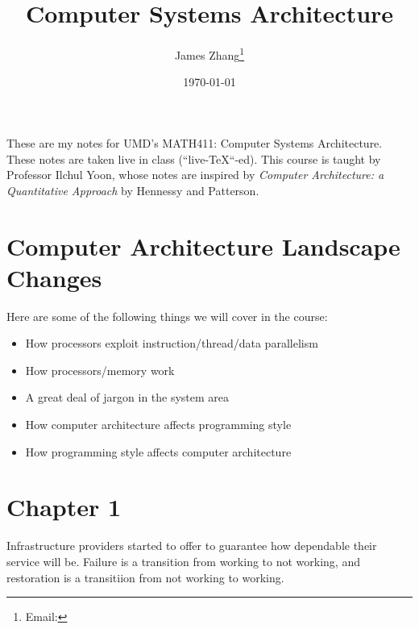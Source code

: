 \documentclass[12pt]{scrartcl}
\begin{document}
\title{Computer Systems Architecture}
\author{James Zhang\thanks{Email: }}
\date{\today}




\maketitle
These are my notes for UMD's MATH411: Computer Systems Architecture. These notes are taken live in class 
(``live-\TeX``-ed). This course is taught by Professor Ilchul Yoon, whose notes are inspired by \textit{Computer Architecture:
 a Quantitative Approach} by Hennessy and Patterson.
\tableofcontents

\newpage

\section*{Computer Architecture Landscape Changes}

Here are some of the following things we will cover in the course:
\begin{itemize}
  \item How processors exploit instruction/thread/data parallelism
  \item How processors/memory work
  \item A great deal of jargon in the system area
  \item How computer architecture affects programming style
  \item How programming style affects computer architecture
\end{itemize}

\section{Chapter 1}

\begin{definition}[Dependability]
  Infrastructure providers started to offer  to guarantee 
  how dependable their service will be. Failure is a transition from working to not working, and 
  restoration is a transitiion from not working to working.
\end{definition}
\end{document}
